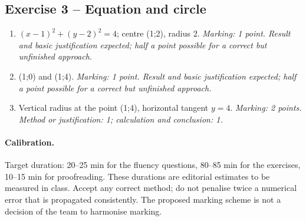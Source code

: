 \subsection*{Exercise 3 -- Equation and circle}
\begin{enumerate}
\item $(x-1)^2+(y-2)^2=4$; centre (1;2), radius 2. \textit{Marking: 1 point. Result and basic justification expected; half a point possible for a correct but unfinished approach.}
\item (1;0) and (1;4). \textit{Marking: 1 point. Result and basic justification expected; half a point possible for a correct but unfinished approach.}
\item Vertical radius at the point (1;4), horizontal tangent $y=4$. \textit{Marking: 2 points. Method or justification: 1; calculation and conclusion: 1.}
\end{enumerate}
\paragraph{Calibration.} Target duration: 20--25 min for the fluency questions, 80--85 min for the exercises, 10--15 min for proofreading. These durations are editorial estimates to be measured in class. Accept any correct method; do not penalise twice a numerical error that is propagated consistently. The proposed marking scheme is not a decision of the team to harmonise marking.
